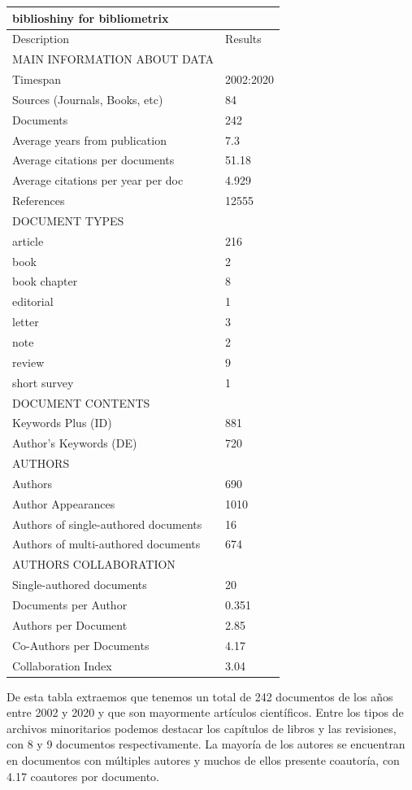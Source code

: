 \documentclass[
]{article}
\begin{document}
\begin{longtable}[]{@{}ll@{}}
\toprule
biblioshiny for bibliometrix & \\
\midrule
\endhead
Description & Results \\
MAIN INFORMATION ABOUT DATA & \\
Timespan & 2002:2020 \\
Sources (Journals, Books, etc) & 84 \\
Documents & 242 \\
Average years from publication & 7.3 \\
Average citations per documents & 51.18 \\
Average citations per year per doc & 4.929 \\
References & 12555 \\
DOCUMENT TYPES & \\
article & 216 \\
book & 2 \\
book chapter & 8 \\
editorial & 1 \\
letter & 3 \\
note & 2 \\
review & 9 \\
short survey & 1 \\
DOCUMENT CONTENTS & \\
Keywords Plus (ID) & 881 \\
Author's Keywords (DE) & 720 \\
AUTHORS & \\
Authors & 690 \\
Author Appearances & 1010 \\
Authors of single-authored documents & 16 \\
Authors of multi-authored documents & 674 \\
AUTHORS COLLABORATION & \\
Single-authored documents & 20 \\
Documents per Author & 0.351 \\
Authors per Document & 2.85 \\
Co-Authors per Documents & 4.17 \\
Collaboration Index & 3.04 \\
\bottomrule
\end{longtable}

De esta tabla extraemos que tenemos un total de 242 documentos de los
años entre 2002 y 2020 y que son mayormente artículos científicos. Entre
los tipos de archivos minoritarios podemos destacar los capítulos de
libros y las revisiones, con 8 y 9 documentos respectivamente. La
mayoría de los autores se encuentran en documentos con múltiples autores
y muchos de ellos presente coautoría, con 4.17 coautores por documento.
\end{document}
